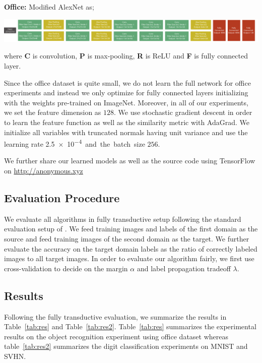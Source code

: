 \noindent \textbf{Office:} Modified AlexNet\cite{alexnet} as;

\includegraphics[width=\columnwidth]{alexnet}


where \textbf{C} is convolution, \textbf{P} is max-pooling, \textbf{R} is ReLU and \textbf{F} is fully connected layer. 

Since the office dataset is quite small, we do not learn the full network for office experiments and instead we only optimize for fully connected layers initializing with the weights pre-trained on ImageNet. Moreover, in all of our experiments, we set the feature dimension as $128$. We use stochastic gradient descent in order to learn the feature function as well as the similarity metric with AdaGrad\cite{adagrad}. We initialize all variables with truncated normals having unit variance and use the learning rate \SI{2.5e-4}  and the batch size $256$. 

We further share our learned models as well as the source code using TensorFlow\cite{tensorflow} on \url{http://anonymous.xyz}


\subsection{Evaluation Procedure}
We evaluate all algorithms in fully transductive setup following the standard evaluation setup of \cite{office}.  We feed training images and labels of the first domain as the source and feed training images of the second domain as the target. We further evaluate the accuracy on the target domain labels as the ratio of correctly labeled images to all target images. In order to evaluate our algorithm fairly, we first use cross-validation to decide on the margin $\alpha$ and label propagation tradeoff $\lambda$. 



\subsection{Results}
Following the fully transductive evaluation, we summarize the results in Table~\ref{tab:res} and Table~\ref{tab:res2}. Table~\ref{tab:res} summarizes the experimental results on the object recognition experiment using office dataset whereas  table~\ref{tab:res2} summarizes the digit classification experiments on MNIST and SVHN.

